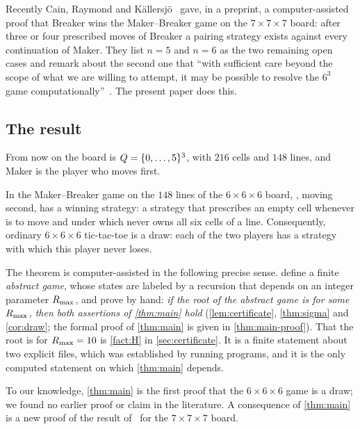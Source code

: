 Recently Cain, Raymond and K\"allersj\"o~\cite{CainRaymondKallersjo2025} gave, in a preprint, a
computer-assisted proof that Breaker wins the Maker--Breaker game on the $7\times7\times7$ board: after
three or four prescribed moves of Breaker a pairing strategy exists against every continuation of
Maker. They list $n=5$ and $n=6$ as the two remaining open cases and remark about the second one that
``with sufficient care beyond the scope of what we are willing to attempt, it may be possible to
resolve the $6^3$ game computationally''~\cite[Section~6.2]{CainRaymondKallersjo2025}. The present paper
does this.

\subsection{The result}\label{ssec:intro-result}

From now on the board is $Q=\{0,\dots,5\}^3$, with $216$ cells and $148$ lines, and Maker is the
player who moves first.

\begin{theorem}\label{thm:main}
In the Maker--Breaker game on the $148$ lines of the $6\times6\times6$ board, \Breaker, moving second,
has a winning strategy: a strategy that prescribes an empty cell whenever \Breaker{} is to move and under
which \Maker{} never owns all six cells of a line. Consequently, ordinary $6\times6\times6$ tic-tac-toe
is a draw: each of the two players has a strategy with which this player never loses.
\end{theorem}

The theorem is computer-assisted in the following precise sense. 
define a finite \emph{abstract game}, whose states are labeled \WON{} by a recursion that depends on an
integer parameter $R_{\max}$, and prove by hand: \emph{if the root of the abstract game is \WON{} for some
$R_{\max}$, then both assertions of \cref{thm:main} hold} (\cref{lem:certificate}, \cref{thm:sigma} and
\cref{cor:draw}; the formal proof of \cref{thm:main} is given in \cref{thm:main-proof}). That the root
is \WON{} for $R_{\max}=10$ is \cref{fact:H} in \cref{sec:certificate}. It is a finite statement about two
explicit files, which was established by running programs, and it is the only computed statement on
which \cref{thm:main} depends.

To our knowledge, \cref{thm:main} is the first proof that the $6\times6\times6$ game is a draw; we
found no earlier proof or claim in the literature. A consequence of \cref{thm:main} is a new proof of
the result of~\cite{CainRaymondKallersjo2025} for the $7\times7\times7$ board.

